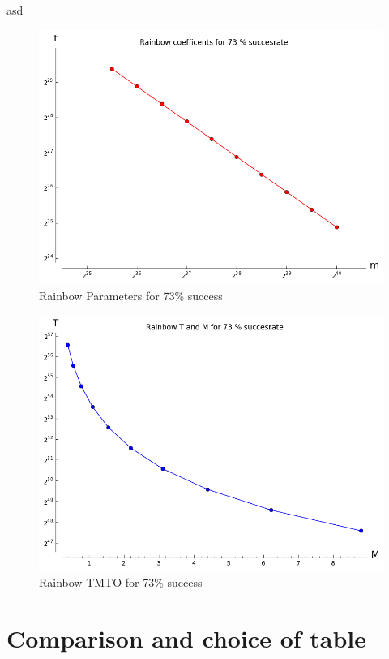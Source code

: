 asd
\begin{figure}[H]
  \centering
  \includegraphics[scale=0.5]{figures/RainbowCoef73.png}
  \caption{Rainbow Parameters for 73\% success}
  \label{fig:param73}
\end{figure}


\begin{figure}[H]
  \centering
  \includegraphics[scale=0.5]{figures/RainbowTime73.png}
  \caption{Rainbow TMTO for 73\% success}
  \label{fig:time73}
\end{figure}
\newpage
\section{Comparison and choice of table}

